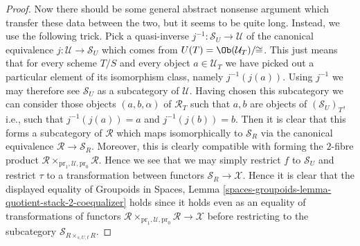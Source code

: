 \begin{proof}
\medskip\noindent
Now there should be some general abstract nonsense
argument which transfer these data between the two, but it seems to
be quite long. Instead, we use the following trick.
Pick a quasi-inverse $j^{-1} : \mathcal{S}_U \to \mathcal{U}$
of the canonical equivalence $j : \mathcal{U} \to \mathcal{S}_U$ which comes
from $U(T) = \Ob(\mathcal{U}_T)/\!\!\cong$.
This just means that for every scheme $T/S$ and every
object $a \in \mathcal{U}_T$ we have picked out a particular
element of its isomorphism class, namely $j^{-1}(j(a))$.
Using $j^{-1}$ we may therefore see $\mathcal{S}_U$
as a subcategory of $\mathcal{U}$. Having chosen this subcategory
we can consider those objects $(a, b, \alpha)$ of $\mathcal{R}_T$
such that $a, b$ are objects of $(\mathcal{S}_U)_T$, i.e., such
that $j^{-1}(j(a)) = a$ and $j^{-1}(j(b)) = b$. Then it is clear that
this forms a subcategory of $\mathcal{R}$ which maps isomorphically
to $\mathcal{S}_R$ via the canonical equivalence
$\mathcal{R} \to \mathcal{S}_R$. Moreover, this is clearly compatible
with forming the $2$-fibre product
$\mathcal{R} \times_{\text{pr}_1, \mathcal{U}, \text{pr}_0} \mathcal{R}$.
Hence we see that we may simply restrict
$f$ to $\mathcal{S}_U$ and restrict $\tau$ to a transformation
between functors $\mathcal{S}_R \to \mathcal{X}$. Hence it is clear that
the displayed equality of
Groupoids in Spaces,
Lemma \ref{spaces-groupoids-lemma-quotient-stack-2-coequalizer}
holds since it holds even as an equality of transformations of functors
$\mathcal{R} \times_{\text{pr}_1, \mathcal{U}, \text{pr}_0} \mathcal{R}
\to \mathcal{X}$ before restricting to the subcategory
$\mathcal{S}_{R \times_{s, U, t} R}$.


\end{proof}
